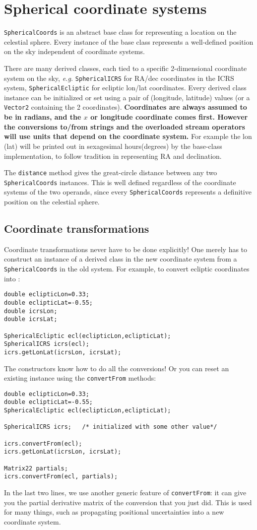 \documentclass[11pt,preprint,flushrt]{aastex}
\begin{document}
\section{Spherical coordinate systems}
{\tt SphericalCoords} is an abstract base class for representing a location on the celestial sphere.  Every instance of the base class represents a well-defined position on the sky independent of coordinate systems.

There are many derived classes, each tied to a specific 2-dimensional coordinate system on the sky, {\it e.g.} {\tt SphericalICRS} for RA/dec coordinates in the ICRS system, {\tt SphericalEcliptic} for ecliptic lon/lat coordinates.  Every derived class instance can be initialized or set using a pair of (longitude, latitude) values (or a {\tt Vector2} containing the 2 coordinates).  {\bf Coordinates are always assumed to be in radians, and the $x$ or longitude coordinate comes first.  However the conversions to/from strings and the overloaded stream operators will use units that depend on the coordinate system.}  For example the lon (lat) will be printed out in sexagesimal hours(degrees) by the base-class implementation, to follow tradition in representing RA and declination.

The {\tt distance} method gives the great-circle distance between any two {\tt SphericalCoords} instances.  This is well defined regardless of the coordinate systems of the two operands, since every {\tt SphericalCoords} represents a definitive position on the celestial sphere.

\subsection{Coordinate transformations}
Coordinate transformations never have to be done explicitly! One merely has to construct an instance of a derived class in the new coordinate system from a {\tt SphericalCoords} in the old system.  For example, to convert ecliptic coordinates into :
\begin{verbatim}
double eclipticLon=0.33;
double eclipticLat=-0.55;
double icrsLon;
double icrsLat;

SphericalEcliptic ecl(eclipticLon,eclipticLat);
SphericalICRS icrs(ecl);
icrs.getLonLat(icrsLon, icrsLat);
\end{verbatim}
The constructors know how to do all the conversions!  Or you can reset an existing instance using the {\tt convertFrom} methods:
\begin{verbatim}
double eclipticLon=0.33;
double eclipticLat=-0.55;
SphericalEcliptic ecl(eclipticLon,eclipticLat);

SphericalICRS icrs;   /* initialized with some other value*/

icrs.convertFrom(ecl);
icrs.getLonLat(icrsLon, icrsLat);

Matrix22 partials;
icrs.convertFrom(ecl, partials);
\end{verbatim}
In the last two lines, we use another generic feature of {\tt convertFrom}: it can give you the partial derivative matrix of the conversion that you just did.  This is used for many things, such as propagating positional uncertainties into a new coordinate system.
\end{document}
